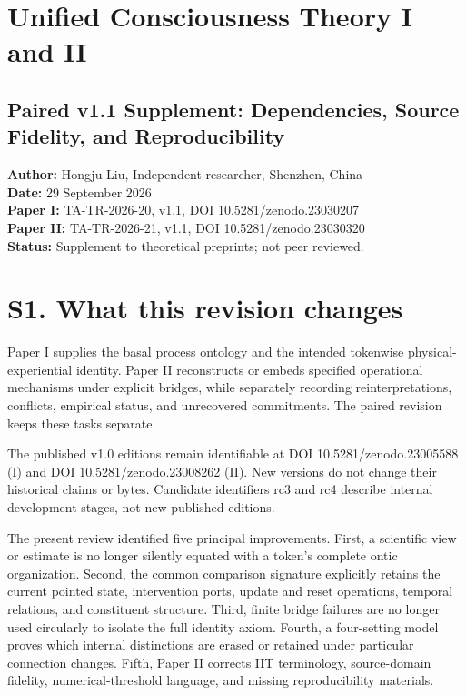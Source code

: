 \documentclass[
  11pt,
  a4paper,
]{article}
\author{}
\date{}
\begin{document}
\hypertarget{unified-consciousness-theory-i-and-ii}{%
\section{Unified Consciousness Theory I and
II}\label{unified-consciousness-theory-i-and-ii}}

\hypertarget{paired-v1.1-supplement-dependencies-source-fidelity-and-reproducibility}{%
\subsection{Paired v1.1 Supplement: Dependencies, Source Fidelity, and
Reproducibility}\label{paired-v1.1-supplement-dependencies-source-fidelity-and-reproducibility}}

\textbf{Author:} Hongju Liu, Independent researcher, Shenzhen, China\\
\textbf{Date:} 29 September 2026\\
\textbf{Paper I:} TA-TR-2026-20, v1.1, DOI 10.5281/zenodo.23030207\\
\textbf{Paper II:} TA-TR-2026-21, v1.1, DOI 10.5281/zenodo.23030320\\
\textbf{Status:} Supplement to theoretical preprints; not peer reviewed.

\hypertarget{s1.-what-this-revision-changes}{%
\section{S1. What this revision
changes}\label{s1.-what-this-revision-changes}}

Paper I supplies the basal process ontology and the intended tokenwise
physical-experiential identity. Paper II reconstructs or embeds
specified operational mechanisms under explicit bridges, while
separately recording reinterpretations, conflicts, empirical status, and
unrecovered commitments. The paired revision keeps these tasks separate.

The published v1.0 editions remain identifiable at DOI
10.5281/zenodo.23005588 (I) and DOI 10.5281/zenodo.23008262 (II). New
versions do not change their historical claims or bytes. Candidate
identifiers rc3 and rc4 describe internal development stages, not new
published editions.

The present review identified five principal improvements. First, a
scientific view or estimate is no longer silently equated with a token's
complete ontic organization. Second, the common comparison signature
explicitly retains the current pointed state, intervention ports, update
and reset operations, temporal relations, and constituent structure.
Third, finite bridge failures are no longer used circularly to isolate
the full identity axiom. Fourth, a four-setting model proves which
internal distinctions are erased or retained under particular connection
changes. Fifth, Paper II corrects IIT terminology, source-domain
fidelity, numerical-threshold language, and missing reproducibility
materials.
\end{document}
